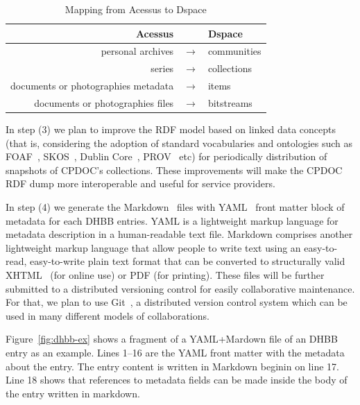 \documentclass{llncs}
\begin{document}
\begin{table}[htbp]
\centering
\begin{tabular}{rcl}
Acessus &  & Dspace \\ \hline
personal archives & $\to$ & communities \\
series & $\to$ & collections \\
documents or photographies metadata & $\to$ & items \\ 
documents or photographies files & $\to$ & bitstreams \\ \hline
\end{tabular}
\caption{Mapping from Acessus to Dspace}\label{tab:map}
\end{table}

In step (3) we plan to improve the RDF model based on linked data
concepts (that is, considering the adoption of standard vocabularies
and ontologies such as FOAF~\cite{foaf}, SKOS~\cite{skos}, Dublin
Core~\cite{dc}, PROV~\cite{prov} etc) for periodically distribution of
snapshots of CPDOC's collections. These improvements will make the
CPDOC RDF dump more interoperable and useful for service providers.

In step (4) we generate the Markdown~\cite{markdown} files with
YAML~\cite{yaml} front matter block of metadata for each DHBB
entries. YAML is a lightweight markup language for metadata
description in a human-readable text file. Markdown comprises another
lightweight markup language that allow people to write text using an
easy-to-read, easy-to-write plain text format that can be converted to
structurally valid XHTML~\cite{xhtml} (for online use) or PDF (for
printing). These files will be further submitted to a distributed
versioning control for easily collaborative maintenance. For that, we
plan to use Git~\cite{git}, a distributed version control system which
can be used in many different models of collaborations.


Figure~\ref{fig:dhbb-ex} shows a fragment of a YAML+Mardown file of an
DHBB entry as an example. Lines 1--16 are the YAML front matter with
the metadata about the entry. The entry content is written in Markdown
beginin on line 17. Line 18 shows that references to metadata fields
can be made inside the body of the entry written in markdown.
\end{document}
